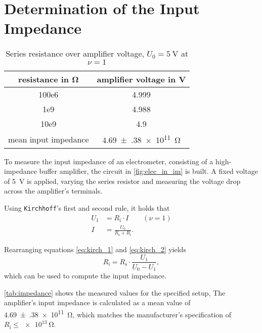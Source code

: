 \section{Determination of the Input Impedance}
\begin{table}[b!]
	\centering
	\caption[Series resistance over amplifier voltage]{Series resistance over amplifier voltage, $U_0=\SI{5}{\volt}$ at $\nu=1$}
	\label{tab:impedance}
	\begin{tabular}{SS}
		\toprule
		{resistance in \si{\ohm}}	&	{amplifier voltage in \si{\volt}}	\\
		\midrule
			100e6	&	4.999	\\
			1e9	&	4.988	\\
			10e9	&	4.9	\\
		\midrule
		{mean input impedance}	&	\SI{4.69(38)e11}{\ohm}\\
		\bottomrule
	\end{tabular}
\end{table}
To measure the input impedance of an electrometer, consisting of a high-impedance buffer amplifier, the circuit in \autoref{fig:elec_in_im} is built.
A fixed voltage of \SI{5}{\volt} is applied, varying the series resistor and measuring the voltage drop across the amplifier's terminals.

Using \texttt{Kirchhoff}'s first and second rule, it holds that
\begin{align}
	U_1	&= 	R_\text{i}\cdot I \label{eq:kirch_1}\qquad(\nu = 1)\\
	I 					&=	\frac{U_0}{R_\text{s}+R_\text{i}}.	\label{eq:kirch_2}
\end{align}

Rearranging equations \ref{eq:kirch_1} and \ref{eq:kirch_2} yields
\begin{equation}
	R_\text{i}=R_\text{s}\cdot\frac{U_1}{U_0-U_1},
\end{equation}
which can be used to compute the input impedance.

\autoref{tab:impedance} shows the measured values for the specified setup,
The amplifier's input impedance is calculated as a mean value of \SI{4.69(38)e11}{\ohm}, which matches the manufacturer's specification of $R_\text{i}\leq\SI{e13}{\ohm}$.
